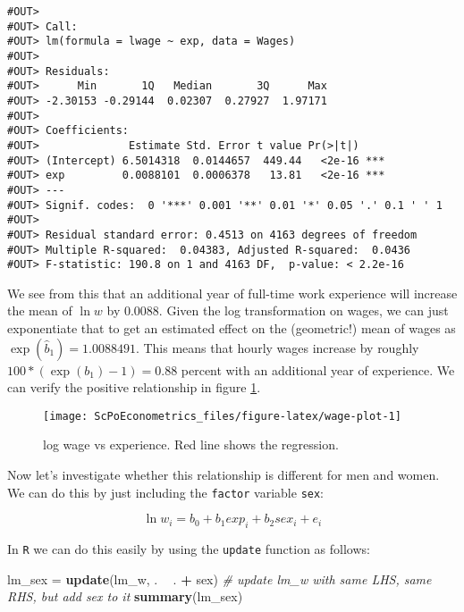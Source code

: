 \documentclass[]{book}
\newenvironment{Shaded}{\begin{snugshade}}{\end{snugshade}}
\newcommand{\KeywordTok}[1]{\textcolor[rgb]{0.13,0.29,0.53}{\textbf{#1}}}
\newcommand{\StringTok}[1]{\textcolor[rgb]{0.31,0.60,0.02}{#1}}
\newcommand{\CommentTok}[1]{\textcolor[rgb]{0.56,0.35,0.01}{\textit{#1}}}
\newcommand{\OperatorTok}[1]{\textcolor[rgb]{0.81,0.36,0.00}{\textbf{#1}}}
\newcommand{\NormalTok}[1]{#1}
\begin{document}
\begin{verbatim}
#OUT> 
#OUT> Call:
#OUT> lm(formula = lwage ~ exp, data = Wages)
#OUT> 
#OUT> Residuals:
#OUT>      Min       1Q   Median       3Q      Max 
#OUT> -2.30153 -0.29144  0.02307  0.27927  1.97171 
#OUT> 
#OUT> Coefficients:
#OUT>              Estimate Std. Error t value Pr(>|t|)    
#OUT> (Intercept) 6.5014318  0.0144657  449.44   <2e-16 ***
#OUT> exp         0.0088101  0.0006378   13.81   <2e-16 ***
#OUT> ---
#OUT> Signif. codes:  0 '***' 0.001 '**' 0.01 '*' 0.05 '.' 0.1 ' ' 1
#OUT> 
#OUT> Residual standard error: 0.4513 on 4163 degrees of freedom
#OUT> Multiple R-squared:  0.04383, Adjusted R-squared:  0.0436 
#OUT> F-statistic: 190.8 on 1 and 4163 DF,  p-value: < 2.2e-16
\end{verbatim}

We see from this that an additional year of full-time work experience
will increase the mean of \(\ln w\) by 0.0088. Given the log
transformation on wages, we can just exponentiate that to get an
estimated effect on the (geometric!) mean of wages as
\(\exp(\hat{b}_1) = 1.0088491\). This means that hourly wages increase
by roughly \(100 * (\exp(b_1)-1) = 0.88\) percent with an additional
year of experience. We can verify the positive relationship in figure
\ref{fig:wage-plot}.

\begin{figure}

{\centering \texttt{[image: ScPoEconometrics\_files/figure-latex/wage-plot-1]} 

}

\caption{log wage vs experience. Red line shows the regression.}\label{fig:wage-plot}
\end{figure}

Now let's investigate whether this relationship is different for men and
women. We can do this by just including the \texttt{factor} variable
\texttt{sex}:

\begin{equation}
\ln w_i = b_0 + b_1 exp_i + b_2 sex_i + e_i \label{eq:wage-sex}
\end{equation}

In \texttt{R} we can do this easily by using the \texttt{update}
function as follows:

\begin{Shaded}
\begin{Highlighting}[]
\NormalTok{lm_sex =}\StringTok{ }\KeywordTok{update}\NormalTok{(lm_w, . }\OperatorTok{~}\StringTok{ }\NormalTok{. }\OperatorTok{+}\StringTok{ }\NormalTok{sex)  }\CommentTok{# update lm_w with same LHS, same RHS, but add sex to it}
\KeywordTok{summary}\NormalTok{(lm_sex)}
\end{Highlighting}
\end{Shaded}
\end{document}
